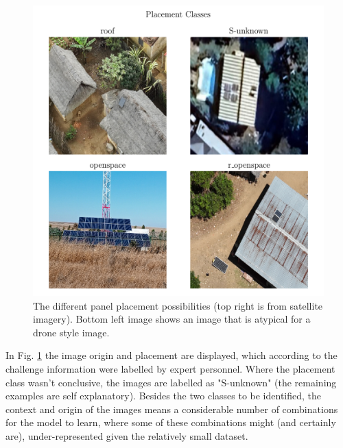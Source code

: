 \documentclass[conference]{IEEEtran}
\begin{document}
\begin{figure}[H]
    \centering
    \includegraphics[width=1\linewidth]{assets/data_placement_classes.png}
    \caption{The different panel placement possibilities (top right is from satellite imagery). Bottom left image shows an image that is atypical for a drone style image.}
    \label{fig:data_placement_classes}
\end{figure}

In Fig. \ref{fig:data_placement_classes} the image origin and placement are displayed, which according to the challenge information were labelled by expert personnel. Where the placement class wasn't conclusive, the images are labelled as "S-unknown" (the remaining examples are self explanatory). Besides the two classes to be identified, the context and origin of the images means a considerable number of combinations for the model to learn, where some of these combinations might (and certainly are), under-represented given the relatively small dataset.

\end{document}
